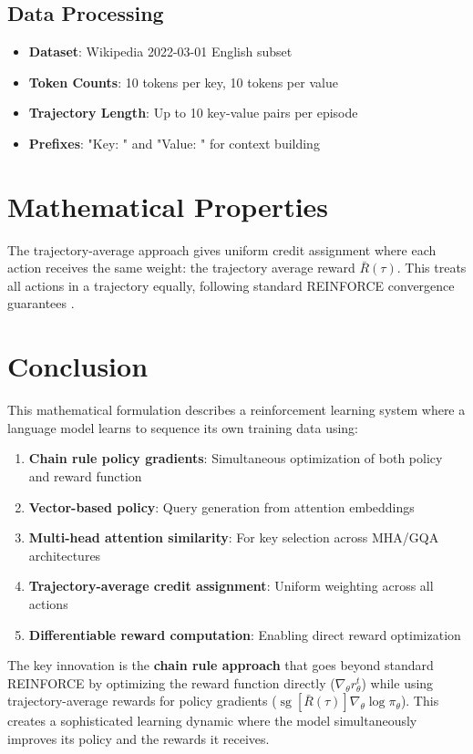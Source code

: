 \documentclass[11pt]{article}
\begin{document}
\subsection{Data Processing}
\begin{itemize}
    \item \textbf{Dataset}: Wikipedia 2022-03-01 English subset
    \item \textbf{Token Counts}: 10 tokens per key, 10 tokens per value
    \item \textbf{Trajectory Length}: Up to 10 key-value pairs per episode
    \item \textbf{Prefixes}: "Key: " and "Value: " for context building
\end{itemize}

\section{Mathematical Properties}

The trajectory-average approach gives uniform credit assignment where each action receives the same weight: the trajectory average reward $\bar{R}(\tau)$. This treats all actions in a trajectory equally, following standard REINFORCE convergence guarantees \cite{williams1992simple}.

\section{Conclusion}

This mathematical formulation describes a reinforcement learning system where a language model learns to sequence its own training data using:

\begin{enumerate}
    \item \textbf{Chain rule policy gradients}: Simultaneous optimization of both policy and reward function
    \item \textbf{Vector-based policy}: Query generation from attention embeddings
    \item \textbf{Multi-head attention similarity}: For key selection across MHA/GQA architectures
    \item \textbf{Trajectory-average credit assignment}: Uniform weighting across all actions
    \item \textbf{Differentiable reward computation}: Enabling direct reward optimization
\end{enumerate}

The key innovation is the \textbf{chain rule approach} that goes beyond standard REINFORCE \cite{williams1992simple} by optimizing the reward function directly ($\nabla_\theta r_\theta^t$) while using trajectory-average rewards for policy gradients ($\operatorname{sg}[\bar{R}(\tau)] \nabla_\theta \log \pi_\theta$). This creates a sophisticated learning dynamic where the model simultaneously improves its policy and the rewards it receives.
\end{document}
